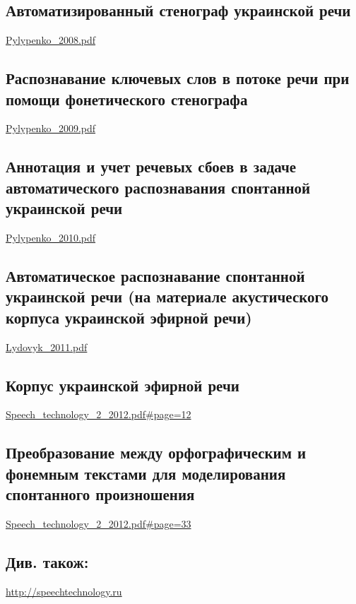 \subsection{Автоматизированный стенограф украинской речи}

\url{Pylypenko_2008.pdf}\cite{Pylypenko_2008}

\subsection{Распознавание ключевых слов в потоке речи при помощи фонетического стенографа}

\url{Pylypenko_2009.pdf}\cite{Pylypenko_2009}

\subsection{Аннотация и учет речевых сбоев в задаче автоматического распознавания спонтанной украинской речи}

\url{Pylypenko_2010.pdf}\cite{Pylypenko_2010}

\subsection{Автоматическое распознавание спонтанной украинской речи (на материале акустического корпуса украинской эфирной речи)}

\url{Lydovyk_2011.pdf}\cite{Lydovyk_2011}

\subsection{Корпус украинской эфирной речи}

\url{Speech_technology_2_2012.pdf#page=12}\cite{Vasilyeva_2012}

\subsection{Преобразование между орфографическим и фонемным текстами для моделирования спонтанного произношения}

\url{Speech_technology_2_2012.pdf#page=33}\cite{Robeyko_2012}

\subsection{Див. також:}

\url{http://speechtechnology.ru}

